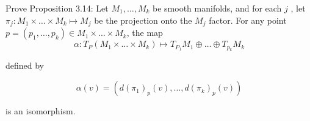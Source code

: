 Prove Proposition 3.14: Let $M_1,\ldots,M_k$ be smooth manifolds, and for each $j$ , let $\pi_j: M_1 \times \ldots \times M_k \mapsto M_j$ be the projection onto the $M_j$ factor. For any point $p = (p_1,\ldots,p_k) \in M_1 \times \ldots \times M_k$, the map 
\begin{equation*}
\alpha: T_P(M_1 \times \ldots \times M_k) \mapsto T_{P_1} M_1 \oplus \ldots \oplus T_{p_k} M_k
\end{equation*}

defined by 

\begin{equation*}
\alpha(v) = (d(\pi_1)_p(v), \ldots, d(\pi_k)_p(v))
\end{equation*}

is an isomorphism.